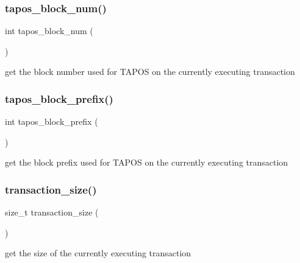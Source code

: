 \subsubsection{\texorpdfstring{tapos\+\_\+block\+\_\+num()}{tapos\_block\_num()}}
{\footnotesize\ttfamily int tapos\+\_\+block\+\_\+num (\begin{DoxyParamCaption}{ }\end{DoxyParamCaption})}

get the block number used for T\+A\+P\+OS on the currently executing transaction \mbox{\label{group__transactioncapi_gaef5458ccfe8ca5d6b273e35d04c56371}} 
\subsubsection{\texorpdfstring{tapos\+\_\+block\+\_\+prefix()}{tapos\_block\_prefix()}}
{\footnotesize\ttfamily int tapos\+\_\+block\+\_\+prefix (\begin{DoxyParamCaption}{ }\end{DoxyParamCaption})}

get the block prefix used for T\+A\+P\+OS on the currently executing transaction \mbox{\label{group__transactioncapi_gadfcd2e00f00461eac891ee8433508609}} 
\subsubsection{\texorpdfstring{transaction\+\_\+size()}{transaction\_size()}}
{\footnotesize\ttfamily size\+\_\+t transaction\+\_\+size (\begin{DoxyParamCaption}{ }\end{DoxyParamCaption})}

get the size of the currently executing transaction 
